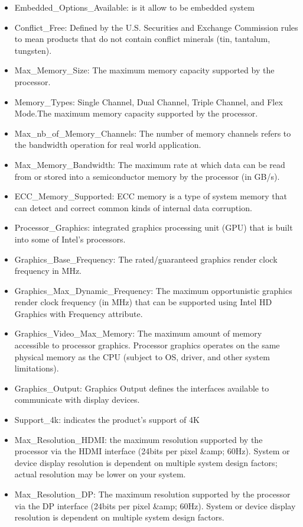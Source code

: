 \begin{itemize}
    \item Embedded\_Options\_Available: is it allow to be embedded system
    \item Conflict\_Free: Defined by the U.S. Securities and Exchange Commission rules to mean products that do not contain conflict minerals (tin, tantalum, tungsten).
    \item Max\_Memory\_Size: The maximum memory capacity supported by the processor. 
    \item Memory\_Types: Single Channel, Dual Channel, Triple Channel, and Flex Mode.The maximum memory capacity supported by the processor.
    \item Max\_nb\_of\_Memory\_Channels: The number of memory channels refers to the bandwidth operation for real world application.
    \item Max\_Memory\_Bandwidth: The maximum rate at which data can be read from or stored into a semiconductor memory by the processor (in GB/s). 
    \item ECC\_Memory\_Supported: ECC memory is a type of system memory that can detect and correct common kinds of internal data corruption.
    \item Processor\_Graphics: integrated graphics processing unit (GPU) that is built into some of Intel's processors.
    \item Graphics\_Base\_Frequency: The rated/guaranteed graphics render clock frequency in MHz.
    \item Graphics\_Max\_Dynamic\_Frequency: The maximum opportunistic graphics render clock frequency (in MHz) that can be supported using Intel HD Graphics with Frequency attribute.
    \item Graphics\_Video\_Max\_Memory: The maximum amount of memory accessible to processor graphics. Processor graphics operates on the same physical memory as the CPU (subject to OS, driver, and other system limitations).
    \item Graphics\_Output: Graphics Output defines the interfaces available to communicate with display devices.
    \item Support\_4k: indicates the product's support of 4K
    \item Max\_Resolution\_HDMI: the maximum resolution supported by the processor via the HDMI interface (24bits per pixel \&amp; 60Hz). System or device display resolution is dependent on multiple system design factors; actual resolution may be lower on your system.
    \item Max\_Resolution\_DP: The maximum resolution supported by the processor via the DP interface (24bits per pixel \&amp; 60Hz). System or device display resolution is dependent on multiple system design factors.

\end{itemize}
